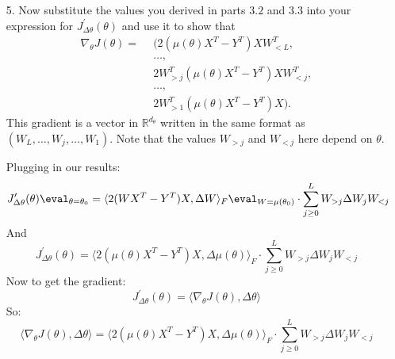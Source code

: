 \documentclass{article}
\begin{document}
\begin{itemize}
        \item [5.] Now substitute the values you derived in parts $3.2$ and $3.3$ into your expression for $J^{\prime}_{\Delta\theta}(\theta)$ and use it to show that
            \begin{align*}
                \nabla_{\theta}J(\theta)=& \hspace{5pt} (2(\mu(\theta)X^{T} - Y^{T})XW^{T}_{<L},          \\
                                         & \hspace{5pt} \ldots,                                           \\
                                         & \hspace{5pt} 2W^{T}_{>j}(\mu(\theta)X^{T} - Y^{T})XW^{T}_{<j}, \\
                                         & \hspace{5pt} \ldots,                                           \\
                                         & \hspace{5pt} 2W^{T}_{> 1}(\mu(\theta)X^{T} - Y^{T})X).       
            \end{align*}
        This gradient is a vector in $\mathbb{R}^{d_{\theta}}$ written in the same format as $(W_{L}, \ldots, W_{j}, \ldots, W_{1})$. Note that the values $W_{> j}$ and $W_{< j}$ here depend on $\theta$.
            \begin{answer}
                Plugging in our results:
                    \begin{equation*}
                        J^{\prime}_{\Delta\theta}(\theta)\eval_{\theta = \theta_{0}} = \langle 2(WX^{T} - Y^{T})X, \Delta W \rangle_{F} \eval_{W = \mu(\theta_{0})}  \cdot \sum_{j \geq 0}^{L} W_{> j} \Delta W_{j} W_{ < j}
                    \end{equation*}
                And 
                    \begin{equation*}
                        J^{\prime}_{\Delta\theta}(\theta) = \langle 2(\mu(\theta)X^{T} - Y^{T})X, \Delta \mu(\theta) \rangle_{F} \cdot \sum_{j \geq 0}^{L} W_{> j} \Delta W_{j} W_{ < j}
                    \end{equation*}
                Now to get the gradient:
                    \begin{equation*}
                        J^{\prime}_{\Delta\theta}(\theta) = \langle \nabla_{\theta}J(\theta), \Delta \theta \rangle
                    \end{equation*}
                So:
                    \begin{equation*}
                        \langle \nabla_{\theta}J(\theta), \Delta \theta \rangle = \langle 2(\mu(\theta)X^{T} - Y^{T})X, \Delta \mu(\theta) \rangle_{F} \cdot \sum_{j \geq 0}^{L} W_{> j} \Delta W_{j} W_{ < j}
                    \end{equation*}
            \end{answer}
    \end{itemize}
\end{document}
